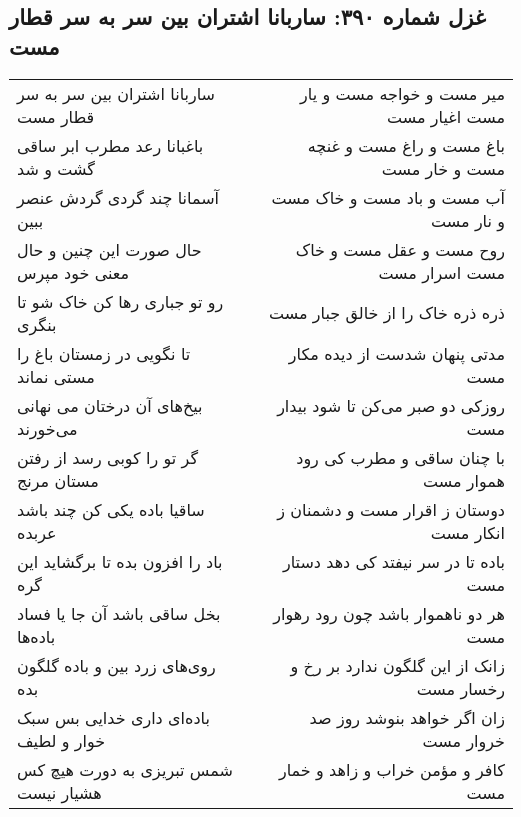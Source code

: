 \begin{center}
\section*{غزل شماره ۳۹۰: ساربانا اشتران بین سر به سر قطار مست}
\label{sec:0390}
\begin{longtable}{l p{0.5cm} r}
ساربانا اشتران بین سر به سر قطار مست
&&
میر مست و خواجه مست و یار مست اغیار مست
\\
باغبانا رعد مطرب ابر ساقی گشت و شد
&&
باغ مست و راغ مست و غنچه مست و خار مست
\\
آسمانا چند گردی گردش عنصر ببین
&&
آب مست و باد مست و خاک مست و نار مست
\\
حال صورت این چنین و حال معنی خود مپرس
&&
روح مست و عقل مست و خاک مست اسرار مست
\\
رو تو جباری رها کن خاک شو تا بنگری
&&
ذره ذره خاک را از خالق جبار مست
\\
تا نگویی در زمستان باغ را مستی نماند
&&
مدتی پنهان شدست از دیده مکار مست
\\
بیخ‌های آن درختان می نهانی می‌خورند
&&
روزکی دو صبر می‌کن تا شود بیدار مست
\\
گر تو را کوبی رسد از رفتن مستان مرنج
&&
با چنان ساقی و مطرب کی رود هموار مست
\\
ساقیا باده یکی کن چند باشد عربده
&&
دوستان ز اقرار مست و دشمنان ز انکار مست
\\
باد را افزون بده تا برگشاید این گره
&&
باده تا در سر نیفتد کی دهد دستار مست
\\
بخل ساقی باشد آن جا یا فساد باده‌ها
&&
هر دو ناهموار باشد چون رود رهوار مست
\\
روی‌های زرد بین و باده گلگون بده
&&
زانک از این گلگون ندارد بر رخ و رخسار مست
\\
باده‌ای داری خدایی بس سبک خوار و لطیف
&&
زان اگر خواهد بنوشد روز صد خروار مست
\\
شمس تبریزی به دورت هیچ کس هشیار نیست
&&
کافر و مؤمن خراب و زاهد و خمار مست
\\
\end{longtable}
\end{center}
